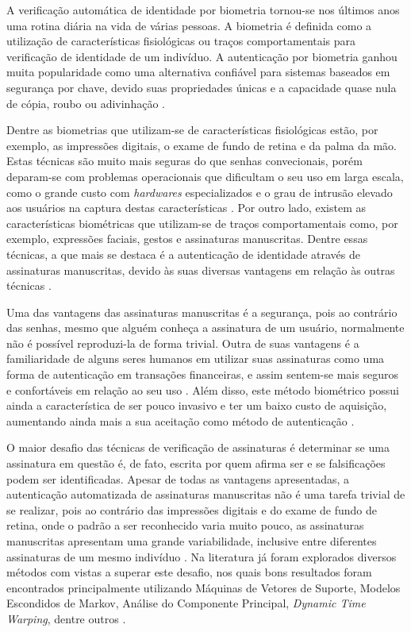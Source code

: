 
A verificação automática de identidade por biometria tornou-se nos últimos anos uma rotina diária na vida de várias pessoas. A biometria é definida como a utilização de características fisiológicas ou traços comportamentais para verificação de identidade de um indivíduo. A autenticação por biometria ganhou muita popularidade como uma alternativa confiável para sistemas baseados em segurança por chave, devido suas propriedades únicas e a capacidade quase nula de cópia, roubo ou adivinhação \cite{kholmatov}.

Dentre as biometrias que utilizam-se de características fisiológicas estão, por exemplo, as impressões digitais, o exame de fundo de retina e da palma da mão. Estas técnicas são muito mais seguras do que senhas convecionais, porém deparam-se com problemas operacionais que dificultam o seu uso em larga escala, como o grande custo com \emph{hardwares} especializados e o grau de intrusão elevado aos usuários na captura destas características \cite{[5]noheinen2002}. Por outro lado, existem as características biométricas que utilizam-se de traços comportamentais como, por exemplo, expressões faciais, gestos e assinaturas manuscritas. Dentre essas técnicas, a que mais se destaca é a autenticação de identidade através de assinaturas manuscritas, devido às suas diversas vantagens em relação às outras técnicas \cite{heinen2002}.

Uma das vantagens das assinaturas manuscritas é a segurança, pois ao contrário das senhas, mesmo que alguém conheça a assinatura de um usuário, normalmente não é possível reproduzi-la de forma trivial. Outra de suas vantagens é a familiaridade de alguns seres humanos em utilizar suas assinaturas como uma forma de autenticação em transações financeiras, e assim sentem-se mais seguros e confortáveis em relação ao seu uso \cite{heinen2004}. Além disso, este método biométrico possui ainda a característica de ser pouco invasivo e ter um baixo custo de aquisição, aumentando ainda mais a sua aceitação como método de autenticação \cite{souza2009}.


O maior desafio das técnicas de verificação de assinaturas é determinar se uma assinatura em questão é, de fato, escrita por quem afirma ser e se falsificações podem ser identificadas. Apesar de todas as vantagens apresentadas, a autenticação automatizada de assinaturas manuscritas não é uma tarefa trivial de se realizar, pois ao contrário das impressões digitais e do exame de fundo de retina, onde o padrão a ser reconhecido varia muito pouco, as assinaturas manuscritas apresentam uma grande variabilidade, inclusive entre diferentes assinaturas de um mesmo indivíduo \cite{heinen2002}. Na literatura já foram explorados diversos métodos com vistas a superar este desafio, nos quais bons resultados foram encontrados principalmente utilizando Máquinas de Vetores de Suporte, Modelos Escondidos de Markov, Análise do Componente Principal, \emph{Dynamic Time Warping}, dentre outros \cite{souza2009}.


